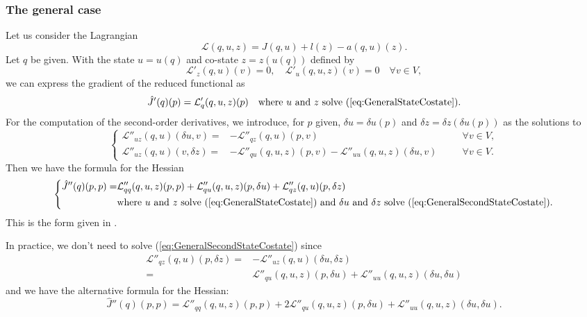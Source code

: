 \subsubsection{The general case}
%
Let us consider the Lagrangian
%
\begin{equation}\label{eq:GerenarlLagrange}
\mathcal L(q,u,z) = J(q,u) + l(z) - a(q,u)(z).
\end{equation}
%
Let $q$ be given. With the state $u=u(q)$ and co-state $z=z(u(q))$ defined by 
%
\begin{equation}\label{eq:GeneralStateCostate}
\mathcal L'_z(q,u)(v)=0,\quad \mathcal L'_u(q,u,z)(v)=0 \quad \forall v\in V,
\end{equation}
%
we can express the gradient of the reduced functional as
%
\begin{equation}\label{eq:GeneralGrad}
\hat J'(q)(p) = \mathcal L'_q(q,u,z)(p)\quad \mbox{where $u$ and $z$ solve (\ref{eq:GeneralStateCostate}).}
\end{equation}
%
For the computation of the second-order derivatives, we introduce, for $p$ given, $\delta u=\delta u(p)$ and $\delta z=\delta z(\delta u(p))$ as the solutions to
%
\begin{equation}\label{eq:GeneralSecondStateCostate}
\left\{
%
\begin{aligned}
\mathcal L''_{uz}(q,u)(\delta u, v)=& -\mathcal L''_{qz}(q,u)(p, v)&\quad&\forall v\in V,\\
\mathcal L''_{uz}(q,u)(v,\delta z)=&-\mathcal L''_{qu}(q,u,z)(p, v)-\mathcal L''_{uu}(q,u,z)(\delta u, v)&\quad&\forall v\in V.
\end{aligned}
%
\right.
\end{equation}
%
Then we have the formula for the  Hessian
%
\begin{equation}\label{eq:GeneralHessian}
%
\left\{
\begin{aligned}
\hat J''(q)(p,p) =& \mathcal L''_{qq}(q,u,z)(p,p) + \mathcal L''_{qu}(q,u,z)(p,\delta u) 
+ \mathcal L''_{qz}(q,u)(p,\delta z)\\
&\mbox{where $u$ and $z$ solve (\ref{eq:GeneralStateCostate}) and $\delta u$ and $\delta z$ solve (\ref{eq:GeneralSecondStateCostate}).} 
\end{aligned}
\right.
%
\end{equation}
This is the form given in \cite{BeckerMeidnerVexler07}. 
%
\begin{remark}\label{rmk:}
In practice, we don't need to solve (\ref{eq:GeneralSecondStateCostate}) since
%
\begin{align*}
\mathcal L''_{qz}(q,u)(p,\delta z) =& -\mathcal L''_{uz}(q,u)(\delta u, \delta z)\\
=& \mathcal L''_{qu}(q,u,z)(p, \delta u)+\mathcal L''_{uu}(q,u,z)(\delta u, \delta u)
\end{align*}
%
and we have the alternative formula for the Hessian:
%
\begin{equation}\label{eq:GeneralHessian2}
\hat J''(q)(p,p) = \mathcal L''_{qq}(q,u,z)(p,p) + 2\mathcal L''_{qu}(q,u,z)(p,\delta u) 
+ \mathcal L''_{uu}(q,u,z)(\delta u, \delta u).
\end{equation}
\end{remark}
%
%
